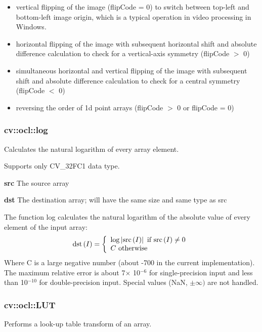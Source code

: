 \documentclass{article}
\begin{document}
\begin{itemize}
\item vertical flipping of the image (flipCode = 0) to switch between top-left and bottom-left image origin, which is a typical operation in video processing in Windows.
\item horizontal flipping of the image with subsequent horizontal shift and absolute difference calculation to check for a vertical-axis symmetry (flipCode $>$ 0)
\item simultaneous horizontal and vertical flipping of the image with subsequent shift and absolute difference calculation to check for a central symmetry (flipCode $<$ 0)
\item reversing the order of 1d point arrays (flipCode $>$ 0 or flipCode = 0)
\end{itemize}

\newpage

\subsubsection{cv::ocl::log }
\label{subsubsec:mylabel16}
Calculates the natural logarithm of every array element.

Supports only CV{\_}32FC1 data type.

\textbf{src }The source array

\textbf{dst }The destination array; will have the same size and same type as
src

The function log calculates the natural logarithm of the absolute value of
every element of the input array:
\[
\mbox{dst}\left( I \right)=\left\{ {{\begin{array}{*{20}c}
 {\log \left| {\mbox{src}\left( I \right)} \right|\mbox{ if src}\left( I
\right)\ne 0} \hfill \\
 {C\mbox{ otherwise}} \hfill \\
\end{array} }} \right.
\]
Where C is a large negative number (about -700 in the current
implementation). The maximum relative error is about 7$\times $ 10$^{-6}$
for single-precision input and less than 10$^{-10}$ for double-precision
input. Special values (NaN, $\pm \infty )$ are not handled.

\newpage

\subsubsection{cv::ocl::LUT}
\label{subsubsec:mylabel17}
Performs a look-up table transform of an array.
\end{document}
